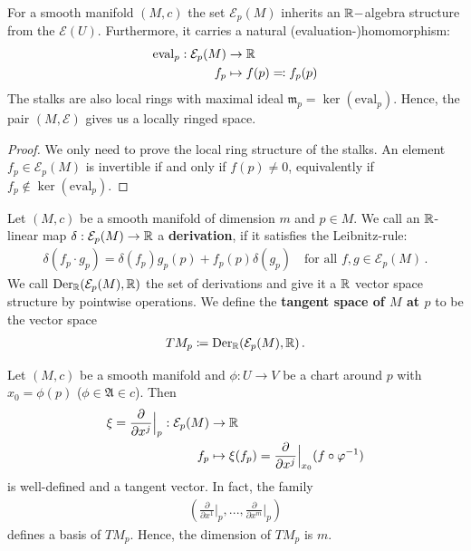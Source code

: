\begin{corollary}
    For a smooth manifold $(M,c)$ the set $\mathcal{E}_p(M)$ inherits an $\mathbb{R}-$algebra structure from the $\mathcal{E}(U)$. Furthermore, it carries a natural (evaluation-)homomorphism:
    \begin{align*}
       \mathrm{eval}_p: \mathcal{E}_p(M) & \to \mathbb{R} \\
                    f_p  & \mapsto f(p)\eqcolon f_p(p)
    \end{align*}
    The stalks are also local rings with maximal ideal $\mathfrak{m}_p=\ker(\mathrm{eval}_p)$. Hence, the pair $(M,\mathcal{E})$ gives us a locally ringed space.
\end{corollary}
\begin{proof}
    We only need to prove the local ring structure of the stalks. An element $f_p\in \mathcal{E}_p(M)$ is invertible if and only if $f(p)\neq 0$, equivalently if $f_p\notin \ker(\mathrm{eval}_p)$.
\end{proof}




\begin{definition}
    Let $(M,c)$ be a smooth manifold of dimension $m$ and $p\in M$. We call an $\mathbb{R}$-linear map $\delta:\mathcal{E}_p(M)\to \mathbb{R}$ a \textbf{derivation}, if it satisfies the Leibnitz-rule:
    \begin{align*}
        \delta(f_p\cdot g_p)=\delta(f_p)g_p(p)+f_p(p)\delta(g_p) \quad \text{for all }f,g\in \mathcal{E}_p(M) \, .
    \end{align*}
    We call $\mathrm{Der}_{\mathbb{R}}(\mathcal{E}_p(M),\mathbb{R})$ the set of derivations and give it a $\mathbb{R}$ vector space structure by pointwise operations. We define the \textbf{tangent space of $M$ at $p$} to be the vector space
    \begin{align*}
        TM_p \coloneq \mathrm{Der}_{\mathbb{R}}(\mathcal{E}_p(M),\mathbb{R}) \, .
    \end{align*}
\end{definition}
\begin{corollary}
    Let $(M,c)$ be a smooth manifold and $\phi:U\to V$ be a chart around $p$ with $x_0=\phi(p)$ ($\phi \in \mathfrak{A}\in c$). Then 
    \begin{align*}
        \xi=\frac{\partial}{\partial x^j}\Big|_p : \mathcal{E}_p(M) &\to \mathbb{R} \\
        f_p & \mapsto \xi(f_p)=\frac{\partial}{\partial x^j}\Big|_{x_0}(f\circ \varphi^{-1} )
    \end{align*} is well-defined and a tangent vector. In fact, the family
    \begin{align*}
        \left(\frac{\partial}{\partial x^1}\Big|_p,...,\frac{\partial}{\partial x^m}\Big|_p\right)
    \end{align*} defines a basis of $TM_p$. Hence, the dimension of $TM_p$ is $m$.
\end{corollary}





